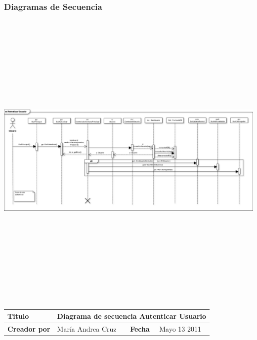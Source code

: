                   
		
			\subsubsection{Diagramas de Secuencia}
			
				\begin{minipage}[c]{1\linewidth}
				\centering
    			\includegraphics[width=20cm, height=15cm, angle=90]
    			{diagramasSecuencia/AutenticarUsuario}\\[0.5cm]
    			
    			\begin{tabular}{|p{0.225\textwidth}|p{}|p{}
    			|p{}|}
			    \hline
			    {\bf Titulo} & 
			    \multicolumn{3}{p{0.675\textwidth}|}{Diagrama de secuencia Autenticar Usuario}\\
			    \hline
			    \hline
			    {\bf Creador por} & {María Andrea Cruz} & {\bf Fecha} & {Mayo 13 2011}\\
			    \hline
			    \end{tabular}
			    \end{minipage}
			    
